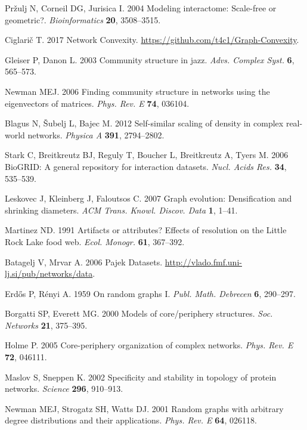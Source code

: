 \documentclass[]{rsif}
\begin{document}
\begin{thebibliography}{99}
Pr{\v z}ulj N, Corneil DG, Jurisica I. 2004  Modeling interactome: {Scale}-free
  or geometric?. {\em Bioinformatics} \textbf{20}, 3508--3515.

Ciglari\v{c} T. 2017  {Network} {Convexity}.
  \url{https://github.com/t4c1/Graph-Convexity}.

Gleiser P, Danon L. 2003  Community structure in jazz. {\em Advs. Complex
  Syst.} \textbf{6}, 565--573.

Newman MEJ. 2006  Finding community structure in networks using the
  eigenvectors of matrices. {\em Phys. Rev. E} \textbf{74}, 036104.

Blagus N, {\v S}ubelj L, Bajec M. 2012  Self-similar scaling of density in
  complex real-world networks. {\em Physica A} \textbf{391}, 2794--2802.

Stark C, Breitkreutz BJ, Reguly T, Boucher L, Breitkreutz A, Tyers M. 2006
  {BioGRID}: {A} general repository for interaction datasets. {\em Nucl. Acids
  Res.} \textbf{34}, 535--539.

Leskovec J, Kleinberg J, Faloutsos C. 2007  Graph evolution: {Densification}
  and shrinking diameters. {\em ACM Trans. Knowl. Discov. Data} \textbf{1},
  1--41.

Martinez ND. 1991  Artifacts or attributes? {Effects} of resolution on the
  {Little} {Rock} {Lake} food web. {\em Ecol. Monogr.} \textbf{61}, 367--392.

Batagelj V, Mrvar A. 2006  {Pajek} {Datasets}.
  \url{http://vlado.fmf.uni-lj.si/pub/networks/data}.

Erd{\H o}s P, R{\'e}nyi A. 1959  On random graphs {I}. {\em Publ. Math.
  Debrecen} \textbf{6}, 290--297.

Borgatti SP, Everett MG. 2000  Models of core/periphery structures. {\em Soc.
  Networks} \textbf{21}, 375--395.

Holme P. 2005  Core-periphery organization of complex networks. {\em Phys. Rev.
  E} \textbf{72}, 046111.

Maslov S, Sneppen K. 2002  Specificity and stability in topology of protein
  networks. {\em Science} \textbf{296}, 910--913.

Newman MEJ, Strogatz SH, Watts DJ. 2001  Random graphs with arbitrary degree
  distributions and their applications. {\em Phys. Rev. E} \textbf{64}, 026118.


\end{thebibliography}
\end{document}
